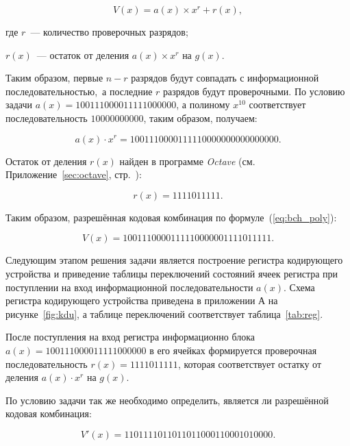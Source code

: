 \begin{equation}
  \label{eq:bch_poly}
  V(x) = a(x) \times x^r + r(x),
\end{equation}


\begin{ESKDexplanation}
\item[где ] $r$~--- количество проверочных разрядов;
\item $r(x)$~--- остаток от деления $a(x) \times x^r$ на $g(x)$.
\end{ESKDexplanation}

Таким образом, первые $n-r$ разрядов будут совпадать с информационной
последовательностью,~а последние $r$ разрядов будут проверочными. По
условию задачи $a(x) = 100111000011111000000$, а полиному $x^{10}$
соответствует последовательность $10000000000$, таким образом,
получаем:

\begin{equation*}
  a(x) \cdot x^r = 1001110000111110000000000000000.
\end{equation*}

Остаток от деления $r(x)$ найден в программе
\textit{Octave} (см. Приложение~\ref{sec:octave},
стр.~\pageref{page2}):

\begin{equation*}
r(x) = 1111011111.
\end{equation*}


Таким образом, разрешённая кодовая комбинация по
формуле~(\ref{eq:bch_poly}):

\begin{equation*}
  V(x) = 1001110000111110000001111011111.
\end{equation*}

Следующим этапом решения задачи является построение регистра
кодирующего устройства и приведение таблицы переключений состояний
ячеек регистра при поступлении на вход информационной
последовательности $a(x)$. Схема регистра кодирующего устройства
приведена в приложении А на рисунке~\ref{fig:kdu}, а таблице
переключений соответствует таблица~\ref{tab:reg}.

После поступления на вход регистра информационно блока $a(x) =
100111000011111000000$ в его ячейках формируется проверочная
последовательность $r(x) = 1111011111$, которая соответствует остатку от
деления $a(x) \cdot x^r$ на $g(x)$.

По условию задачи так же необходимо определить, является ли разрешённой
кодовая комбинация:

\begin{equation*}
  V'(x) = 1101111011011011000110001010000.
\end{equation*}

